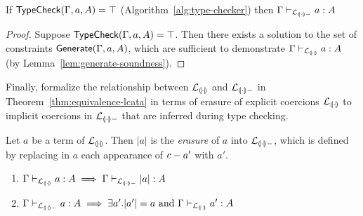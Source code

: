 \documentclass[runningheads]{llncs}
\begin{document}

\begin{theorem}
  \label{thm:typecheck-soundness}
  If $\textsf{TypeCheck}(\Gamma, a, A) = \top$ (Algorithm~\ref{alg:type-checker}) then $\Gamma \vdash_{\mathcal{L}_{{\llparenthesis \cdot \rrparenthesis-}}} a : A$
\end{theorem}
\begin{proof}
  Suppose $\textsf{TypeCheck}(\Gamma, a, A) = \top$.
  Then there exists a solution to the set of constraints $\textsf{Generate}(\Gamma, a, A)$, which are sufficient to demonstrate $\Gamma \vdash_{\mathcal{L}_{{\llparenthesis \cdot \rrparenthesis}}} a : A$ (by Lemma~\ref{lem:generate-soundness}).
\end{proof}

Finally, formalize the relationship between $\mathcal{L}_{{\llparenthesis \cdot \rrparenthesis}}$ and $\mathcal{L}_{{\llparenthesis \cdot \rrparenthesis-}}$ in Theorem~\ref{thm:equivalence-lcata} in terms of erasure of explicit coercions $\mathcal{L}_{{\llparenthesis \cdot \rrparenthesis}}$ to implicit coercions in $\mathcal{L}_{{\llparenthesis \cdot \rrparenthesis-}}$ that are inferred during type checking.

\begin{definition}
  Let $a$ be a term of $\mathcal{L}_{{\llparenthesis \cdot \rrparenthesis}}$. Then $|a|$ is the \textit{erasure} of $a$ into $\mathcal{L}_{{\llparenthesis \cdot \rrparenthesis-}}$, which is defined by replacing in $a$ each appearance of $c - a'$ with $a'$.
\end{definition}

\begin{theorem}
  \label{thm:equivalence-lcata}
  \begin{enumerate}
    \item $\Gamma \vdash_{\mathcal{L}_{{\llparenthesis \cdot \rrparenthesis}}} a : A \implies \Gamma \vdash_{\mathcal{L}_{{\llparenthesis \cdot \rrparenthesis-}}} |a| : A$
    \item $\Gamma \vdash_{\mathcal{L}_{{\llparenthesis \cdot \rrparenthesis-}}} a : A \implies \exists a' . |a'| = a ~\text{and}~ \Gamma \vdash_{\mathcal{L}_{{\llparenthesis \cdot \rrparenthesis}}} a' : A$
  \end{enumerate}
\end{theorem}
\end{document}
